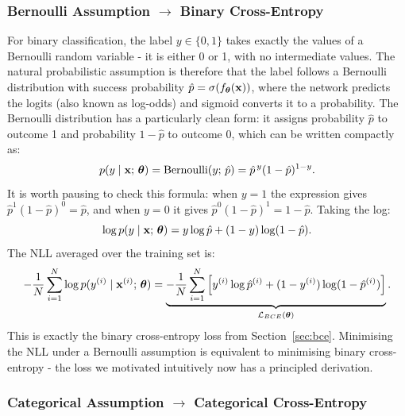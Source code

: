 \subsubsection{Bernoulli Assumption $\to$ Binary Cross-Entropy}

For binary classification, the label $y \in \{0, 1\}$ takes exactly the values of a Bernoulli random variable - it is either 0 or 1, with no intermediate values. The natural probabilistic assumption is therefore that the label follows a Bernoulli distribution with success probability $\hat{p} = \sigma(f_{\boldsymbol{\theta}}(\mathbf{x}))$, where the network predicts the logits (also known as log-odds) and sigmoid converts it to a probability. The Bernoulli distribution has a particularly clean form: it assigns probability $\hat{p}$ to outcome 1 and probability $1 - \hat{p}$ to outcome 0, which can be written compactly as:
\begin{equation}
    p(y \mid \mathbf{x};\, \boldsymbol{\theta}) = \text{Bernoulli}(y;\, \hat{p}) = \hat{p}^{\,y}(1-\hat{p})^{1-y}.
\end{equation}
It is worth pausing to check this formula: when $y=1$ the expression gives $\hat{p}^1(1-\hat{p})^0 = \hat{p}$, and when $y=0$ it gives $\hat{p}^0(1-\hat{p})^1 = 1-\hat{p}$. Taking the log:
\begin{equation}
    \log p(y \mid \mathbf{x};\, \boldsymbol{\theta}) = y \log \hat{p} + (1-y)\log(1-\hat{p}).
\end{equation}
The NLL averaged over the training set is:
\begin{equation}
    -\frac{1}{N}\sum_{i=1}^{N} \log p(y^{(i)} \mid \mathbf{x}^{(i)};\, \boldsymbol{\theta}) = \underbrace{-\frac{1}{N}\sum_{i=1}^{N}\left[y^{(i)}\log\hat{p}^{(i)} + (1-y^{(i)})\log(1-\hat{p}^{(i)})\right]}_{\mathcal{L}_{BCE}(\boldsymbol{\theta})}.
\end{equation}
This is exactly the binary cross-entropy loss from Section~\ref{sec:bce}. Minimising the NLL under a Bernoulli assumption is equivalent to minimising binary cross-entropy - the loss we motivated intuitively now has a principled derivation.


\subsubsection{Categorical Assumption $\to$ Categorical Cross-Entropy}

